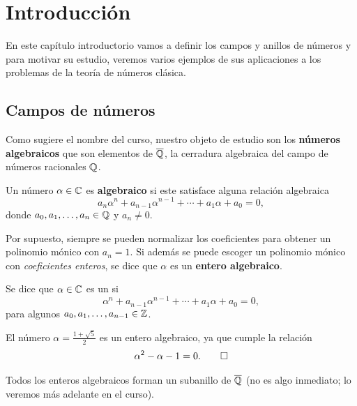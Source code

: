 \chapter{Introducción}

En este capítulo introductorio vamos a definir los campos y anillos de números y
para motivar su estudio, veremos varios ejemplos de sus aplicaciones a los
problemas de la teoría de números clásica.


\section{Campos de números}

Como sugiere el nombre del curso, nuestro objeto de estudio son los
\textbf{números algebraicos} que son elementos de $\overline{\mathbb{Q}}$, la cerradura
algebraica del campo de números racionales $\mathbb{Q}$.

\begin{definicion}
  Un número $\alpha \in \mathbb{C}$ es \textbf{algebraico} si este satisface alguna
  relación algebraica
  $$a_n \alpha^n + a_{n-1} \alpha^{n-1} + \cdots + a_1 \alpha + a_0 = 0,$$
  donde $a_0,a_1,\ldots,a_n \in \mathbb{Q}$ y $a_n \ne 0$.
\end{definicion}

Por supuesto, siempre se pueden normalizar los coeficientes para obtener un
polinomio mónico con $a_n = 1$. Si además se puede escoger un polinomio mónico
con \emph{coeficientes enteros}, se dice que $\alpha$ es un
\textbf{entero algebraico}.

\begin{definicion}
  Se dice que $\alpha \in \mathbb{C}$ es un  si
  $$\alpha^n + a_{n-1} \alpha^{n-1} + \cdots + a_1 \alpha + a_0 = 0,$$
  para algunos $a_0,a_1,\ldots,a_{n-1} \in \mathbb{Z}$.
\end{definicion}

\begin{ejemplo}
  El número $\alpha = \frac{1 + \sqrt{5}}{2}$ es un entero algebraico, ya que
  cumple la relación
  \[ \alpha^2 - \alpha - 1 = 0. \qedhere \]
\end{ejemplo}

Todos los enteros algebraicos forman un subanillo de $\overline{\mathbb{Q}}$
(no es algo inmediato; lo veremos más adelante en el curso).

